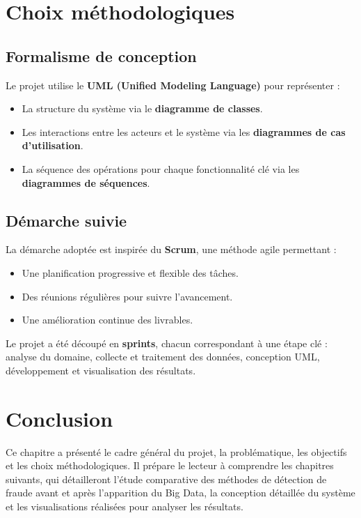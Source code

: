 \section{Choix méthodologiques}

\subsection{Formalisme de conception}
Le projet utilise le \textbf{UML (Unified Modeling Language)} pour représenter :
\begin{itemize}
    \item La structure du système via le \textbf{diagramme de classes}.
    \item Les interactions entre les acteurs et le système via les \textbf{diagrammes de cas d’utilisation}.
    \item La séquence des opérations pour chaque fonctionnalité clé via les \textbf{diagrammes de séquences}.
\end{itemize}

\subsection{Démarche suivie}
La démarche adoptée est inspirée du \textbf{Scrum}, une méthode agile permettant :
\begin{itemize}
    \item Une planification progressive et flexible des tâches.
    \item Des réunions régulières pour suivre l’avancement.
    \item Une amélioration continue des livrables.
\end{itemize}

Le projet a été découpé en \textbf{sprints}, chacun correspondant à une étape clé : 
analyse du domaine, collecte et traitement des données, conception UML, développement et visualisation des résultats.

\section{Conclusion}
Ce chapitre a présenté le cadre général du projet, la problématique, les objectifs et les choix méthodologiques. 
Il prépare le lecteur à comprendre les chapitres suivants, qui détailleront l’étude comparative des méthodes de détection de fraude 
avant et après l’apparition du Big Data, la conception détaillée du système et les visualisations réalisées pour analyser les résultats.